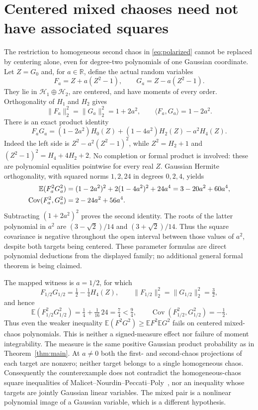 \documentclass[11pt]{article}
\newcommand{\E}{\mathbb E}
\newcommand{\R}{\mathbb R}
\newcommand{\Hh}{\mathcal H}
\newcommand{\Cov}{\operatorname{Cov}}
\begin{document}
\section{Centered mixed chaoses need not have associated squares}
The restriction to homogeneous second chaos in
\eqref{eq:polarized} cannot be replaced by centering alone, even
for degree-two polynomials of one Gaussian coordinate. Let $Z=G_0$
and, for $a\in\R$, define the actual random variables
\[
 F_a=Z+a(Z^2-1),\qquad G_a=Z-a(Z^2-1).
\]
They lie in $\Hh_1\oplus\Hh_2$, are centered, and have moments
of every order. Orthogonality of $H_1$ and $H_2$ gives
\begin{equation}\label{eq:mixturenorm}
 \|F_a\|_2^2=\|G_a\|_2^2=1+2a^2,\qquad
 \langle F_a,G_a\rangle=1-2a^2.
\end{equation}
There is an exact product identity
\begin{equation}\label{eq:mixtureproduct}
 F_aG_a=(1-2a^2)H_0(Z)+(1-4a^2)H_2(Z)-a^2H_4(Z).
\end{equation}
Indeed the left side is $Z^2-a^2(Z^2-1)^2$, while
$Z^2=H_2+1$ and $(Z^2-1)^2=H_4+4H_2+2$. No completion
or formal product is involved: these are polynomial equalities
pointwise for every real $Z$. Gaussian Hermite orthogonality,
with squared norms $1,2,24$ in degrees $0,2,4$, yields
\begin{align}\label{eq:mixturecovariance}
 \E(F_a^2G_a^2)&=(1-2a^2)^2+2(1-4a^2)^2+24a^4
                    =3-20a^2+60a^4,\notag\\
 \Cov(F_a^2,G_a^2)&=2-24a^2+56a^4.
\end{align}
Subtracting $(1+2a^2)^2$ proves the second identity.
The roots of the latter polynomial in $a^2$ are
$(3-\sqrt2)/14$ and $(3+\sqrt2)/14$. Thus the square covariance
is negative throughout the open interval between those values
of $a^2$, despite both targets being centered. These parameter
formulas are direct polynomial deductions from the displayed
family; no additional general formal theorem is being claimed.

The mapped witness is $a=1/2$, for which
\[
 F_{1/2}G_{1/2}=\tfrac12-\tfrac14H_4(Z),\qquad
 \|F_{1/2}\|_2^2=\|G_{1/2}\|_2^2=\tfrac32,
\]
and hence
\[
 \E(F_{1/2}^2G_{1/2}^2)=\tfrac14+\tfrac1{16}\,24
 =\tfrac74<\tfrac94,
 \qquad \Cov(F_{1/2}^2,G_{1/2}^2)=-\tfrac12.
\]
Thus even the weaker inequality
$\E(F^2G^2)\geq\E F^2\E G^2$ fails on centered mixed-chaos
polynomials. This is neither a signed-measure effect nor failure
of moment integrability. The measure is the same positive
Gaussian product probability as in Theorem~\ref{thm:main}.
At $a\ne0$ both the first- and second-chaos projections of each
target are nonzero; neither target belongs to a single homogeneous
chaos. Consequently the counterexample does not contradict the
homogeneous-chaos square inequalities of
Malicet--Nourdin--Peccati--Poly~\cite{MNPP}, nor an inequality
whose targets are jointly Gaussian linear variables. The mixed
pair is a nonlinear polynomial image of a Gaussian variable,
which is a different hypothesis.
\end{document}
